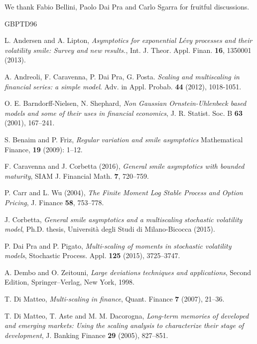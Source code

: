 \documentclass[a4paper,reqno,11pt]{amsart}
\numberwithin{equation}{section}
\begin{document}
We thank Fabio Bellini, Paolo Dai Pra and Carlo Sgarra for fruitful discussions.



\begin{thebibliography}{GBPTD96}

L. Andersen and A. Lipton,
\textit{Asymptotics for exponential L\'evy processes and their volatility smile: 
Survey and new results.}, Int. J. Theor. Appl. Finan. \textbf{16}, 1350001 (2013).

 A. Andreoli, F. Caravenna, P. Dai Pra, G. Posta.
\emph{Scaling and multiscaling in financial series: a simple model}.
Adv. in Appl. Probab. \textbf{44} (2012), 1018-1051.

O. E. Barndorff-Nielsen, N. Shephard, 
\textit{Non Gaussian Ornstein-Uhlenbeck based models 
and some of their uses in financial economics}, 
J. R. Statist. Soc. B {\bf 63} (2001), 167--241.

S. Benaim and P. Friz,
\textit{Regular variation and smile asymptotics}
Mathematical Finance, \textbf{19} (2009): 1--12.

F. Caravenna and J. Corbetta (2016),
\textit{General smile asymptotics with bounded maturity},
SIAM J. Financial Math. \textbf{7}, 720--759.

P. Carr and L. Wu (2004),
\textit{The Finite Moment Log Stable Process and Option Pricing},
J. Finance \textbf{58}, 753–778.

J. Corbetta,
\textit{General smile asymptotics and a multiscaling stochastic volatility model},
Ph.D. thesis, Università degli Studi di Milano-Bicocca (2015).

P. Dai Pra and P. Pigato,
\textit{Multi-scaling of moments in stochastic volatility models},
Stochastic Process. Appl. \textbf{125} (2015), 3725--3747.

A. Dembo and O. Zeitouni, 
\textit{Large deviations techniques and applications}, 
Second Edition, Springer--Verlag, New York, 1998.

T. Di Matteo,
\textit{Multi-scaling in finance},
Quant. Finance \textbf{7} (2007), 21--36.

T. Di Matteo, T. Aste and M. M. Dacorogna,
\textit{Long-term memories of developed and emerging markets: 
Using the scaling analysis to characterize their stage of development},
J. Banking Finance \textbf{29} (2005), 827--851.


\end{thebibliography}
\end{document}

